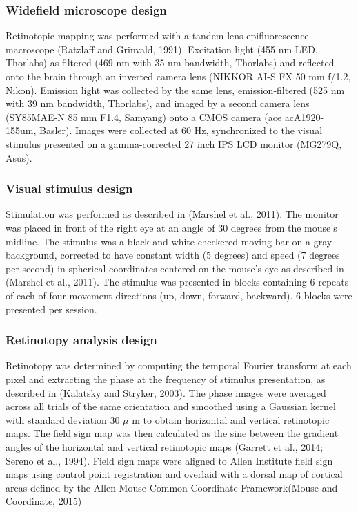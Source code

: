 \subsubsection{Widefield microscope design}
Retinotopic mapping was performed with a tandem-lens epifluorescence macroscope (Ratzlaff and Grinvald, 1991). Excitation light (455 nm LED, Thorlabs) as filtered (469 nm with 35 nm bandwidth, Thorlabs) and reflected onto the brain through an inverted camera lens (NIKKOR AI-S FX 50 mm f/1.2, Nikon). Emission light was collected by the same lens, emission-filtered (525 nm with 39 nm bandwidth, Thorlabs), and imaged by a second camera lens (SY85MAE-N 85 mm F1.4, Samyang) onto a CMOS camera (ace acA1920-155um, Basler). Images were collected at 60 Hz, synchronized to the visual stimulus presented on a gamma-corrected 27 inch IPS LCD monitor (MG279Q, Asus). 

\subsubsection{Visual stimulus design}
Stimulation was performed as described in (Marshel et al., 2011). The monitor was placed in front of the right eye at an angle of 30 degrees from the mouse’s midline. The stimulus was a black and white checkered moving bar on a gray background, corrected to have constant width (5 degrees) and speed (7 degrees per second) in spherical coordinates centered on the mouse’s eye as described in (Marshel et al., 2011). The stimulus was presented in blocks containing 6 repeats of each of four movement directions (up, down, forward, backward). 6 blocks were presented per session. 

\subsubsection{Retinotopy analysis design}
Retinotopy was determined by computing the temporal Fourier transform at each pixel and extracting the phase at the frequency of stimulus presentation, as described in (Kalatsky and Stryker, 2003). The phase images were averaged across all trials of the same orientation and smoothed using a Gaussian kernel with standard deviation 30 $\mu$ m to obtain horizontal and vertical retinotopic maps. The field sign map was then calculated as the sine between the gradient angles of the horizontal and vertical retinotopic maps (Garrett et al., 2014; Sereno et al., 1994). Field sign maps were aligned to Allen Institute field sign maps using control point registration and overlaid with a dorsal map of cortical areas defined by the Allen Mouse Common Coordinate Framework(Mouse and Coordinate, 2015)

